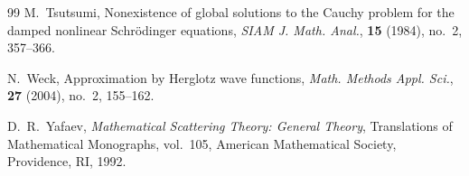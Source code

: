 \documentclass[11pt,reqno,oneside]{amsart}
\numberwithin{equation}{section}
\theoremstyle{definition}
\theoremstyle{remark}
\numberwithin{equation}{section}
\begin{document}
\begin{thebibliography}{99}
		M.~Tsutsumi,
		Nonexistence of global solutions to the Cauchy problem for the damped nonlinear Schr\"odinger equations,
		\textit{SIAM J. Math. Anal.},
		\textbf{15} (1984), no.~2, 357--366.
		
		N.~Weck,
		Approximation by Herglotz wave functions,
		\textit{Math. Methods Appl. Sci.},
		\textbf{27} (2004), no.~2, 155--162.
		
		D.~R.~Yafaev,
		\textit{Mathematical Scattering Theory: General Theory},
		Translations of Mathematical Monographs, vol.~105,
		American Mathematical Society, Providence, RI, 1992.
		
	\end{thebibliography}
	
\end{document}
